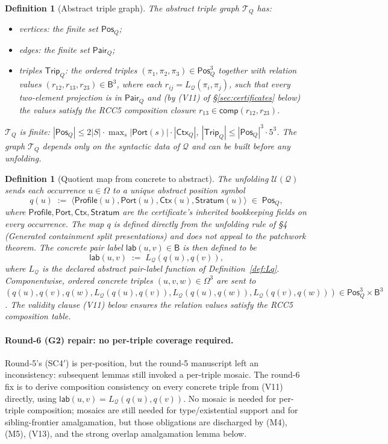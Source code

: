 \documentclass[11pt]{article}
\newtheorem{definition}[theorem]{Definition}
\newcommand{\Base}{\mathsf{B}}
\newcommand{\comp}{\mathsf{comp}}
\newcommand{\Q}{\mathcal Q}
\newcommand{\U}{\mathcal U}
\newcommand{\Ctx}{\mathsf{Ctx}}
\newcommand{\Port}{\mathsf{Port}}
\newcommand{\lab}{\mathsf{lab}}
\newcommand{\Pos}{\mathsf{Pos}}
\newcommand{\Pair}{\mathsf{Pair}}
\newcommand{\Trip}{\mathsf{Trip}}
\newcommand{\Profile}{\mathsf{Profile}}
\newcommand{\Stratum}{\mathsf{Stratum}}
\begin{document}
\begin{definition}[Abstract triple graph]\label{def:T-Q}
The abstract triple graph $\mathcal T_Q$ has:
\begin{itemize}
\item vertices: the finite set $\Pos_Q$;
\item edges: the finite set $\Pair_Q$;
\item triples $\Trip_Q$: the ordered triples
$(\pi_1,\pi_2,\pi_3)\in\Pos_Q^3$ together with relation values
$(r_{12},r_{13},r_{23})\in\Base^3$, where each $r_{ij}=L_\Q(\pi_i,\pi_j)$,
such that every two-element projection is in $\Pair_Q$ and (by (V11) of
\S\ref{sec:certificates} below) the values satisfy the RCC5
composition closure $r_{13}\in\comp(r_{12},r_{23})$.
\end{itemize}
$\mathcal T_Q$ is finite: $|\Pos_Q|\le 2|S|\cdot
\max_s|\Port(s)|\cdot|\Ctx_Q|$, $|\Trip_Q|\le|\Pos_Q|^3\cdot 5^3$.
The graph $\mathcal T_Q$ depends only on the syntactic data of
$\Q$ and can be built before any unfolding.
\end{definition}

\begin{definition}[Quotient map from concrete to abstract]\label{def:quotient-map}
The unfolding $\U(\Q)$ sends each occurrence $u\in\Omega$ to a
unique abstract position symbol
\[
  q(u)\;:=\;\langle\Profile(u),\Port(u),\Ctx(u),\Stratum(u)\rangle\;\in\;\Pos_Q,
\]
where $\Profile,\Port,\Ctx,\Stratum$ are the certificate's
inherited bookkeeping fields on every occurrence.  The map $q$ is
defined directly from the unfolding rule of \S4 (Generated
containment split presentations) and
does not appeal to the patchwork theorem.  The concrete pair label
$\lab(u,v)\in\Base$ is then defined to be
\[
  \lab(u,v)\;:=\;L_\Q(q(u),q(v)),
\]
where $L_\Q$ is the declared abstract pair-label function of
Definition~\ref{def:Lq}.  Componentwise, ordered concrete triples
$(u,v,w)\in\Omega^3$ are sent to
$(q(u),q(v),q(w),L_\Q(q(u),q(v)),L_\Q(q(u),q(w)),L_\Q(q(v),q(w)))
\in\Pos_Q^3\times\Base^3$.  The validity clause (V11) below
ensures the relation values satisfy the RCC5 composition table.
\end{definition}

\paragraph{Round-6 (G2) repair: no per-triple coverage required.}
Round-5's (SC4$'$) is per-position, but the round-5 manuscript
left an inconsistency: subsequent lemmas still invoked a
per-triple mosaic.  The round-6 fix is to derive composition
consistency on every concrete triple from (V11) directly, using
$\lab(u,v)=L_\Q(q(u),q(v))$.  No mosaic is needed for per-triple
composition; mosaics are still needed for type/existential
support and for sibling-frontier amalgamation, but those obligations
are discharged by (M4), (M5), (V13), and the strong overlap
amalgamation lemma below.
\end{document}
